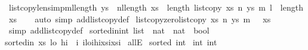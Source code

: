 \begin{isabellebody}
%
\endisadelimproof
\isanewline
{}\isamarkupfalse%
\ list{\isacharunderscore}copy{\isacharunderscore}len{\isacharbrackleft}simp{\isacharbrackright}{\isacharcolon}{\isachardoublequoteopen}{\isacharparenleft}m{\isacharplus}l{\isacharparenright}{\isasymle}length\ ys\ {\isasymLongrightarrow}\ {\isacharparenleft}n{\isacharplus}l{\isacharparenright}{\isasymle}length\ xs\ {\isasymLongrightarrow}\ {\isacharparenleft}length\ {\isacharparenleft}list{\isacharunderscore}copy\ xs\ n\ ys\ m\ l{\isacharparenright}\ {\isacharequal}\ length\ xs{\isacharparenright}{\isachardoublequoteclose}\isanewline
%
\isadelimproof
\ \ %
\endisadelimproof
%
\isatagproof
{}\isamarkupfalse%
\ {\isacharparenleft}auto\ simp\ add{\isacharcolon}list{\isacharunderscore}copy{\isacharunderscore}def{\isacharparenright}%
\endisatagproof
{\isafoldproof}%
%
\isadelimproof
\isanewline
%
\endisadelimproof
\isanewline
{}\isamarkupfalse%
\ list{\isacharunderscore}copy{\isacharunderscore}zero{\isacharcolon}{\isachardoublequoteopen}list{\isacharunderscore}copy\ xs\ n\ ys\ m\ {}\ {\isacharequal}\ xs{\isachardoublequoteclose}\isanewline
%
\isadelimproof
\ \ %
\endisadelimproof
%
\isatagproof
{}\isamarkupfalse%
\ {\isacharparenleft}simp\ add{\isacharcolon}list{\isacharunderscore}copy{\isacharunderscore}def{\isacharparenright}%
\endisatagproof
{\isafoldproof}%
%
\isadelimproof
\isanewline
%
\endisadelimproof
\isanewline
{}\isamarkupfalse%
\ sorted{\isacharunderscore}in{\isacharcolon}{\isacharcolon}{\isachardoublequoteopen}int\ list\ {\isasymRightarrow}\ nat\ {\isasymRightarrow}\ nat\ {\isasymRightarrow}\ bool{\isachardoublequoteclose}\ \isanewline
{\isachardoublequoteopen}sorted{\isacharunderscore}in\ xs\ lo\ hi\ {\isacharequal}\ {\isacharparenleft}{\isasymforall}i{\isachardot}\ {\isacharparenleft}i{\isasymge}lo{\isasymand}i{\isacharless}hi{\isacharparenright}{\isasymlongrightarrow}{\isacharparenleft}xs{\isacharbang}i{\isasymle}xs{\isacharbang}{\isacharparenleft}i{\isacharplus}{}{\isacharparenright}{\isacharparenright}{\isacharparenright}{\isachardoublequoteclose}\isanewline
\isanewline
{}\isamarkupfalse%
\ allE\isanewline
{}\isamarkupfalse%
\ {\isachardoublequoteopen}sorted\ {\isacharbrackleft}{}{\isacharcomma}{\isacharminus}{}{\isacharcolon}{\isacharcolon}int{\isacharbrackright}{\isachardoublequoteclose}\isanewline
{}\isamarkupfalse%
\ {\isachardoublequoteopen}{\isacharparenleft}{\isacharbrackleft}{}{\isacharcolon}{\isacharcolon}int{\isacharcomma}{\isacharminus}{}{\isacharbrackright}{\isacharbang}{}{\isacharparenright}\ {\isasymle}{\isacharparenleft}{\isacharbrackleft}{}{\isacharcolon}{\isacharcolon}int{\isacharcomma}{\isacharminus}{}{\isacharbrackright}{\isacharbang}{}{\isacharparenright}{\isachardoublequoteclose}\isanewline

\end{isabellebody}
